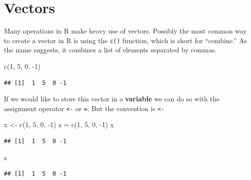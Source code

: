 \documentclass[
]{book}
\newenvironment{Shaded}{\begin{snugshade}}{\end{snugshade}}
\newcommand{\DecValTok}[1]{\textcolor[rgb]{0.00,0.00,0.81}{#1}}
\newcommand{\FunctionTok}[1]{\textcolor[rgb]{0.00,0.00,0.00}{#1}}
\newcommand{\NormalTok}[1]{#1}
\newcommand{\OtherTok}[1]{\textcolor[rgb]{0.56,0.35,0.01}{#1}}
\newcommand{\SpecialCharTok}[1]{\textcolor[rgb]{0.00,0.00,0.00}{#1}}
\begin{document}
\hypertarget{vectors}{%
\chapter{Vectors}\label{vectors}}

Many operations in R make heavy use of vectors. Possibly the most common way to create a vector in R is using the \texttt{c()} function, which is short for ``combine.'' As the name suggests, it combines a list of elements separated by commas.

\begin{Shaded}
\begin{Highlighting}[]
\FunctionTok{c}\NormalTok{(}\DecValTok{1}\NormalTok{, }\DecValTok{5}\NormalTok{, }\DecValTok{0}\NormalTok{, }\SpecialCharTok{{-}}\DecValTok{1}\NormalTok{)}
\end{Highlighting}
\end{Shaded}

\begin{verbatim}
## [1]  1  5  0 -1
\end{verbatim}

If we would like to store this vector in a \textbf{variable} we can do so with the assignment operator \texttt{\textless{}-} or \texttt{=}. But the convention is \texttt{\textless{}-}

\begin{Shaded}
\begin{Highlighting}[]
\NormalTok{x }\OtherTok{\textless{}{-}} \FunctionTok{c}\NormalTok{(}\DecValTok{1}\NormalTok{, }\DecValTok{5}\NormalTok{, }\DecValTok{0}\NormalTok{, }\SpecialCharTok{{-}}\DecValTok{1}\NormalTok{)}
\NormalTok{z }\OtherTok{=} \FunctionTok{c}\NormalTok{(}\DecValTok{1}\NormalTok{, }\DecValTok{5}\NormalTok{, }\DecValTok{0}\NormalTok{, }\SpecialCharTok{{-}}\DecValTok{1}\NormalTok{)}
\NormalTok{x}
\end{Highlighting}
\end{Shaded}

\begin{verbatim}
## [1]  1  5  0 -1
\end{verbatim}

\begin{Shaded}
\begin{Highlighting}[]
\NormalTok{z}
\end{Highlighting}
\end{Shaded}

\begin{verbatim}
## [1]  1  5  0 -1
\end{verbatim}
\end{document}
